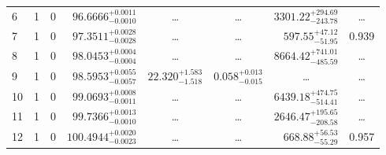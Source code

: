\begin{table*}[!]
\begin{tabular}{llcrrlrc}
6 & 1 & 0 & $     96.6666_{-      0.0010}^{+      0.0011}$ & \multicolumn{1}{c}{\dots} & \multicolumn{1}{c}{\dots} & $     3301.22_{-      243.78}^{+      294.69}$ & \dots\\[1pt]
7 & 1 & 0 & $     97.3511_{-      0.0028}^{+      0.0028}$ & \multicolumn{1}{c}{\dots} & \multicolumn{1}{c}{\dots} & $      597.55_{-       51.95}^{+       47.12}$ & 0.939\\[1pt]
8 & 1 & 0 & $     98.0453_{-      0.0004}^{+      0.0004}$ & \multicolumn{1}{c}{\dots} & \multicolumn{1}{c}{\dots} & $     8664.42_{-      485.59}^{+      741.01}$ & \dots\\[1pt]
9 & 1 & 0 & $     98.5953_{-      0.0057}^{+      0.0055}$ & $      22.320_{-       1.518}^{+       1.583}$ & $       0.058_{-       0.015}^{+       0.013}$ & \multicolumn{1}{c}{\dots} & \dots\\[1pt]
10 & 1 & 0 & $     99.0693_{-      0.0011}^{+      0.0008}$ & \multicolumn{1}{c}{\dots} & \multicolumn{1}{c}{\dots} & $     6439.18_{-      514.41}^{+      474.75}$ & \dots\\[1pt]
11 & 1 & 0 & $     99.7366_{-      0.0010}^{+      0.0013}$ & \multicolumn{1}{c}{\dots} & \multicolumn{1}{c}{\dots} & $     2646.47_{-      208.58}^{+      195.65}$ & \dots \\[1pt]
12 & 1 & 0 & $    100.4944_{-      0.0023}^{+      0.0020}$ & \multicolumn{1}{c}{\dots} & \multicolumn{1}{c}{\dots} & $      668.88_{-       55.29}^{+       56.53}$ & 0.957\\[1pt]


\end{tabular}
\end{table*}
